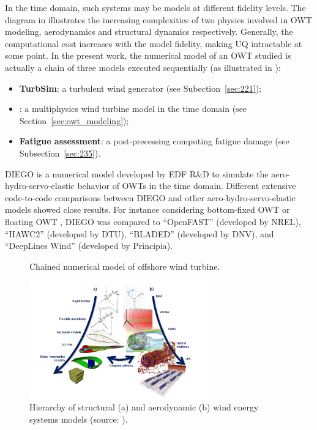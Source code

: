 In the time domain, such systems may be models at different fidelity levels. 
The diagram in  illustrates the increasing complexities of two physics involved in OWT modeling, aerodynamics and structural dynamics respectively. 
Generally, the computational cost increases with the model fidelity, making UQ intractable at some point. 
In the present work, the numerical model of an OWT studied is actually a chain of three models executed sequentially (as illustrated in ): 
\begin{itemize}
    \item \textbf{TurbSim}: a turbulent wind generator (see Subection~\ref{sec:221});
    \item \textbf{\footnotemark}: a multiphysics wind turbine model in the time domain (see Section~\ref{sec:owt_modeling}); 
    \item \textbf{Fatigue assessment}: a post-precessing computing fatigue damage (see Subsection~\ref{sec:235}). 
\end{itemize}
DIEGO is a numerical model developed by EDF R\&D to simulate the aero-hydro-servo-elastic behavior of OWTs in the time domain. 
Different extensive code-to-code comparisons between DIEGO and other aero-hydro-servo-elastic models showed close results. 
For instance considering bottom-fixed OWT \citep{popko_2021_DIEGO_benchmark} or floating OWT \citep{robertson_2020_diego_benchmark,kim_natarajan_2022}, DIEGO was compared to ``OpenFAST'' (developed by NREL), ``HAWC2'' (developed by DTU), ``BLADED'' (developed by DNV), and ``DeepLines Wind'' (developed by Principia). 


\begin{figure}[h]
    \centering
    
    \caption{Chained numerical model of offshore wind turbine.}
    \label{fig:owt_chained_model}
\end{figure}


\begin{figure}
    \centering
    \includegraphics[width=0.7\textwidth]{./part1/figures/OWT_modeling_fidelities.png}
    \caption{Hierarchy of structural (a) and aerodynamic (b) wind energy systems models (source: \citealp{veers_2019_review}).}
    \label{fig:owt_modeling_fidelities}
\end{figure}



